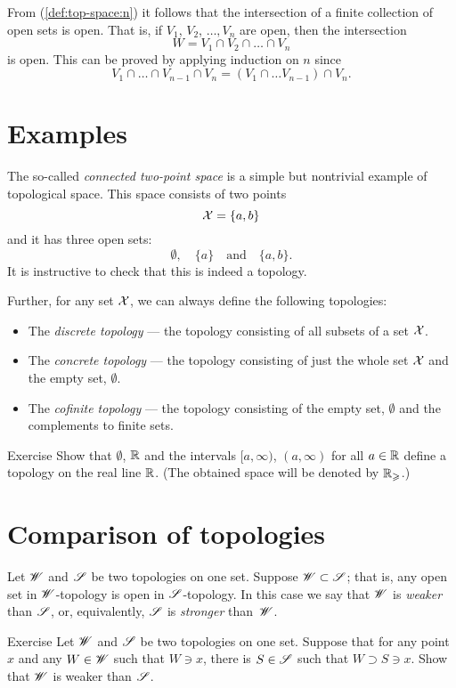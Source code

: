 From (\ref{def:top-space:n}) it follows that the intersection of a finite collection of open sets is open.
That is, if $V_1$, $V_2$, $\dots, V_n$ are open, then the intersection 
\[W=V_1 \cap V_2\cap\dots\cap V_n\] is open.
This can be proved by applying induction on $n$ since 
\[V_1 \cap \dots\cap V_{n-1}\cap V_n=(V_1 \cap \dots V_{n-1})\cap V_n.\]

\section{Examples}

The so-called \emph{connected two-point space} is a simple but nontrivial example of topological space.
This space consists of two points 
\[\mathcal{X}=\{a,b\}\]
and it has three open sets: 
\[\emptyset,\quad \{a\}\quad\text{and}\quad\{a,b\}.\]
It is instructive to check that this is indeed a topology.

Further, for any set $\mathcal{X}$, we can always define the following topologies:
\begin{itemize} 
\item  The \emph{discrete topology} --- the topology consisting of all subsets of a set $\mathcal{X}$.
\item  The \emph{concrete topology}  --- the topology consisting of just the whole set $\mathcal{X}$ and the empty set, $\emptyset$.
\item  The \emph{cofinite topology} --- the topology consisting of the empty set, $\emptyset$ and the complements to finite sets.
\end{itemize}

\begin{thm}{Exercise}\label{ex:Rge}
Show that $\emptyset$, $\mathbb{R}$ and the intervals $[a,\infty)$, $(a,\infty)$ for all $a\in\mathbb{R}$ define a topology on the real line $\mathbb{R}$.
(The obtained space will be denoted by $\mathbb{R}_\geqslant$.)
\end{thm}

\section{Comparison of topologies}

Let $\mathscr{W}$ and $\mathscr{S}$ be two topologies on one set.
Suppose $\mathscr{W}\subset\mathscr{S}$; that is, any open set in $\mathscr{W}$-topology is open in $\mathscr{S}$-topology.
In this case we say that $\mathscr{W}$ is \emph{weaker} than $\mathscr{S}$, or, equivalently, $\mathscr{S}$ is \emph{stronger} than~$\mathscr{W}$.

\begin{thm}{Exercise}
Let $\mathscr{W}$ and $\mathscr{S}$ be two topologies on one set.
Suppose that for any point $x$ and any $W\in\mathscr{W}$ such that $W\ni x$, there is $S\in \mathscr{S}$ such that 
$W\supset S\ni x$.
Show that $\mathscr{W}$ is weaker than $\mathscr{S}$.
\end{thm}



